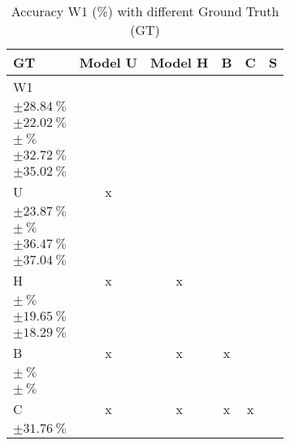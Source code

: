 \begin{table}[H]
\small
\centering
\caption{\label{tab:base3dRPEdatamask}%
  Accuracy W1 (\%) with different Ground Truth (GT)
}
\begin{tabular}{lccccc}
  \toprule
  GT & Model U                                                         & Model H                                                         & B                                                     & C                                                               & S \\
  \midrule
  W1 & \makecell{$\SI{75.31}{\percent}$ \\ $\pm \SI{28.84}{\percent}$} & \makecell{$\SI{25.05}{\percent}$ \\ $\pm \SI{22.02}{\percent}$} & \makecell{$\SI{}{\percent}$ \\ $\pm \SI{}{\percent}$} & \makecell{$\SI{50.78}{\percent}$ \\ $\pm \SI{32.72}{\percent}$} & \makecell{$\SI{38.16}{\percent}$ \\ $\pm \SI{35.02}{\percent}$} \\
  U & x                                                                & \makecell{$\SI{25.57}{\percent}$ \\ $\pm \SI{23.87}{\percent}$} & \makecell{$\SI{}{\percent}$ \\ $\pm \SI{}{\percent}$} & \makecell{$\SI{49.61}{\percent}$ \\ $\pm \SI{36.47}{\percent}$} & \makecell{$\SI{38.73}{\percent}$ \\ $\pm \SI{37.04}{\percent}$} \\
  H & x                                                                & x                                                               & \makecell{$\SI{}{\percent}$ \\ $\pm \SI{}{\percent}$} & \makecell{$\SI{41.98}{\percent}$ \\ $\pm \SI{19.65}{\percent}$} & \makecell{$\SI{82.51}{\percent}$ \\ $\pm \SI{18.29}{\percent}$} \\
  B & x                                                                & x                                                               & x                                                     & \makecell{$\SI{}{\percent}$ \\ $\pm \SI{}{\percent}$}           & \makecell{$\SI{}{\percent}$ \\ $\pm \SI{}{\percent}$} \\
  C & x                                                                & x                                                               & x                                                     & x                                                               & \makecell{$\SI{54.47}{\percent}$ \\ $\pm \SI{31.76}{\percent}$} \\

\end{tabular}
\end{table}
